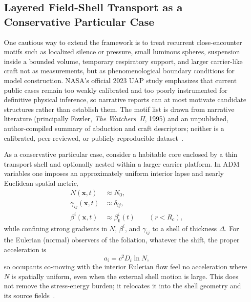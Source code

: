 \documentclass[aps,prd,twocolumn,superscriptaddress,nofootinbib,floatfix]{revtex4-2}
\begin{document}
\subsection{Layered Field-Shell Transport as a Conservative Particular Case}\label{sec:lfsht}

One cautious way to extend the framework is to treat recurrent close-encounter
motifs such as localized silence or pressure, small luminous spheres,
suspension inside a bounded volume, temporary respiratory support, and larger
carrier-like craft not as measurements, but as phenomenological boundary
conditions for model construction. NASA's official 2023 UAP study emphasizes
that current public cases remain too weakly calibrated and too poorly
instrumented for definitive physical inference, so narrative reports can at
most motivate candidate structures rather than establish them. The motif list is
drawn from narrative literature (principally Fowler, \textit{The Watchers~II},
1995) and an unpublished, author-compiled summary of abduction and craft
descriptors; neither is a calibrated, peer-reviewed, or publicly reproducible
dataset~\cite{Fowler1995,NASA_UAP2023}.

As a conservative particular case, consider a habitable core enclosed by a thin
transport shell and optionally nested within a larger carrier platform. In ADM
variables one imposes an approximately uniform interior lapse and nearly
Euclidean spatial metric,
\begin{equation}
\begin{aligned}
N(\mathbf{x},t) &\approx N_0,\\
\gamma_{ij}(\mathbf{x},t) &\approx \delta_{ij},\\
\beta^i(\mathbf{x},t) &\approx \beta^i_0(t)\qquad (r<R_c),
\end{aligned}
\label{eq:s09-core}
\end{equation}
while confining strong gradients in $N$, $\beta^i$, and $\gamma_{ij}$ to a
shell of thickness $\Delta$. For the Eulerian (normal) observers of the
foliation, whatever the shift, the proper acceleration is
\begin{equation}
a_i = c^{2} D_i \ln N,
\label{eq:s09-lapse}
\end{equation}
so occupants co-moving with the interior Eulerian flow feel no acceleration where
$N$ is spatially uniform, even when the external shell motion is large. This does
not remove the stress-energy burden; it relocates it into the shell geometry and
its source fields~\cite{BobrickMartire2021,MTW1973,Wald1984,Fuchs2024}.
\end{document}
